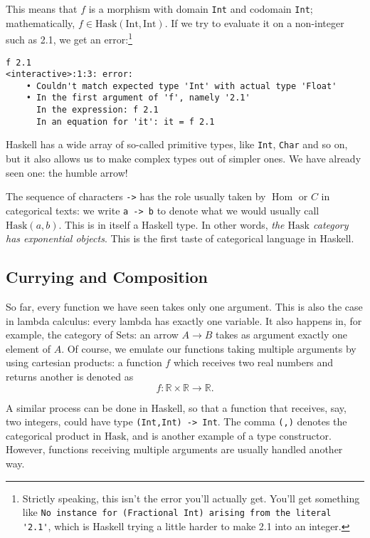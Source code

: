 \documentclass[11	pt]{article}
\theoremstyle{nonumberplain}
\newcommand{\R}{\mathbb{R}}
\newcommand{\Hask}{\mathrm{Hask}}
\newcommand{\type}[1]{\mathrm{#1}}
\newcommand{\cat}[1]{\mathrm{#1}}
\DeclareMathOperator{\Hom}{Hom}
\newcommand*\lsin{\lstinline}
\begin{document}
This means that $f$ is a morphism with domain \lstinline|Int| and codomain \lstinline|Int|; mathematically, $f \in \Hask(\type{Int}, \type{Int})$. If we try to evaluate it on a non-integer such as 2.1, we get an error:\footnote{Strictly speaking, this isn't the error you'll actually get. You'll get something like \lstinline|No instance for (Fractional Int) arising from the literal '2.1'|, which is Haskell trying a little harder to make 2.1 into an integer.}
\begin{lstlisting}
f 2.1
<interactive>:1:3: error:
    • Couldn't match expected type 'Int' with actual type 'Float'
    • In the first argument of 'f', namely '2.1'
      In the expression: f 2.1
      In an equation for 'it': it = f 2.1
\end{lstlisting}

Haskell has a wide array of so-called primitive types, like \lstinline|Int|, \lstinline|Char| and so on, but it also allows us to make complex types out of simpler ones. We have already seen one: the humble arrow!

The sequence of characters \lstinline|->| has the role usually taken by $\Hom$ or $C$ in categorical texts: we write \lsin|a -> b| to denote what we would usually call $\Hask(a,b)$. This is in itself a Haskell type. In other words, \emph{the $\Hask$ category has exponential objects}. This is the first taste of categorical language in Haskell.

\subsection{Currying and Composition}

So far, every function we have seen takes only one argument. This is also the case in lambda calculus: every lambda has exactly one variable. It also happens in, for example, the category of $\cat{Sets}$: an arrow $A \to B$ takes as argument exactly one element of $A$. Of course, we emulate our functions taking multiple arguments by using cartesian products: a function $f$ which receives two real numbers and returns another is denoted as
\begin{equation}
f \colon \R \times \R \to \R.
\end{equation}

A similar process can be done in Haskell, so that a function that receives, say, two integers, could have type \lsin|(Int,Int) -> Int|. The comma \lsin|(,)| denotes the categorical product in $\Hask$, and is another example of a type constructor. However, functions receiving multiple arguments are usually handled another way.
\end{document}

